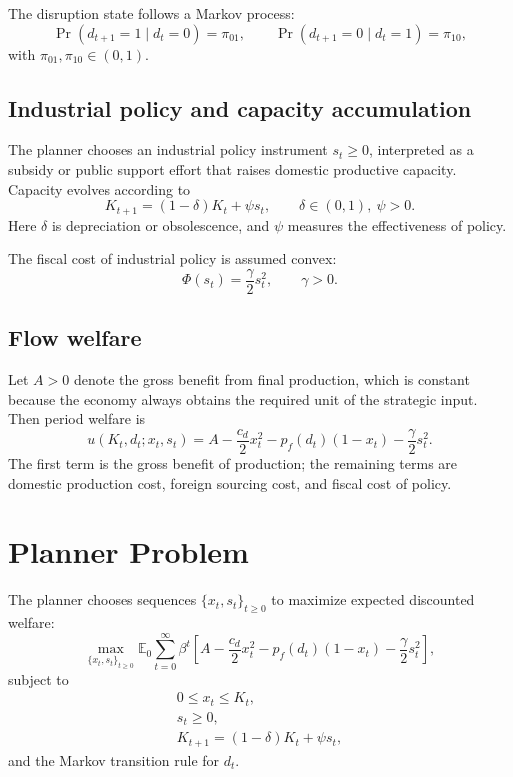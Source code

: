 \documentclass[11pt]{article}
\begin{document}
The disruption state follows a Markov process:
\begin{equation}
\Pr(d_{t+1}=1 \mid d_t=0)=\pi_{01}, \qquad
\Pr(d_{t+1}=0 \mid d_t=1)=\pi_{10},
\end{equation}
with $\pi_{01},\pi_{10}\in(0,1)$.

\subsection{Industrial policy and capacity accumulation}

The planner chooses an industrial policy instrument $s_t \ge 0$, interpreted as a subsidy or public support effort that raises domestic productive capacity. Capacity evolves according to
\begin{equation}
K_{t+1}=(1-\delta)K_t+\psi s_t,
\qquad \delta \in (0,1), \ \psi>0.
\end{equation}
Here $\delta$ is depreciation or obsolescence, and $\psi$ measures the effectiveness of policy.

The fiscal cost of industrial policy is assumed convex:
\begin{equation}
\Phi(s_t)=\frac{\gamma}{2}s_t^2,
\qquad \gamma>0.
\end{equation}

\subsection{Flow welfare}

Let $A>0$ denote the gross benefit from final production, which is constant because the economy always obtains the required unit of the strategic input. Then period welfare is
\begin{equation}
u(K_t,d_t;x_t,s_t)
=
A-\frac{c_d}{2}x_t^2-p_f(d_t)(1-x_t)-\frac{\gamma}{2}s_t^2.
\end{equation}
The first term is the gross benefit of production; the remaining terms are domestic production cost, foreign sourcing cost, and fiscal cost of policy.

\section{Planner Problem}

The planner chooses sequences $\{x_t,s_t\}_{t\ge 0}$ to maximize expected discounted welfare:
\begin{equation}
\max_{\{x_t,s_t\}_{t\ge 0}}
\mathbb{E}_0
\sum_{t=0}^{\infty}
\beta^t
\left[
A-\frac{c_d}{2}x_t^2-p_f(d_t)(1-x_t)-\frac{\gamma}{2}s_t^2
\right],
\end{equation}
subject to
\begin{align}
0 \le x_t \le K_t, \\
s_t \ge 0, \\
K_{t+1}=(1-\delta)K_t+\psi s_t,
\end{align}
and the Markov transition rule for $d_t$.
\end{document}
